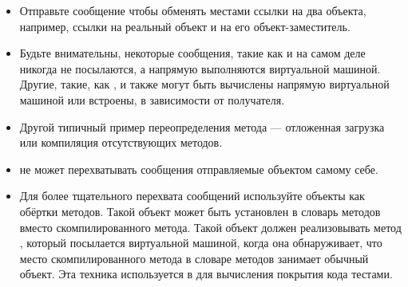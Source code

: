 \documentclass[a4paper,10pt,twoside]{book}
\begin{document}
\begin{itemize}
\item Отправьте сообщение  чтобы обменять местами ссылки на два объекта, например, ссылки на реальный объект и на его объект-заместитель.
\item Будьте внимательны, некоторые сообщения, такие как  и  на самом деле никогда не посылаются, а напрямую выполняются виртуальной машиной. Другие, такие, как \ct{+}, \ct{-} и  также могут быть вычислены напрямую виртуальной машиной или встроены, в зависимости от получателя.
\item Другой типичный пример переопределения метода  --- отложенная загрузка или компиляция отсутствующих методов.
\item {} не может перехватывать сообщения отправляемые объектом самому себе.
\item Для более тщательного перехвата сообщений используйте объекты как обёртки методов. Такой объект может быть установлен в словарь методов вместо скомпилированного метода. Такой объект должен реализовывать метод , который посылается виртуальной машиной, когда она обнаруживает, что место скомпилированного метода в словаре методов занимает обычный объект. Эта техника используется в  для вычисления покрытия кода тестами.
\end{itemize}

\ifx\wholebook\relax\else
   
   
\end{document}
